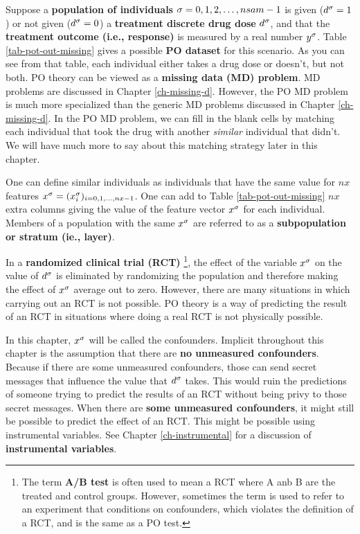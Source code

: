 Suppose a {\bf population
of individuals} $\sigma=0,1,2, \ldots, nsam-1$
is given ($d^\sigma=1$) or
not given ($d^\sigma=0$)
a {\bf treatment discrete drug dose} $d^\sigma$,
and that
the 
 {\bf treatment outcome (i.e., response)}
is measured by
a real number $y^\sigma$.
Table \ref{tab-pot-out-missing}
gives a possible {\bf PO dataset}
for this scenario.
As you
can see from
that table,
each individual 
either takes a drug
dose or
doesn't,
but not both.
PO theory
can be viewed as a
 {\bf  missing
data (MD) problem}. MD problems are 
discussed in
 Chapter \ref{ch-missing-d}.
However, the PO MD problem 
is much more specialized
than the generic MD problems
discussed in Chapter \ref{ch-missing-d}.
In the PO MD
problem, we can
fill
in the blank cells
by matching
each individual
that took
the drug with
another {\it similar} 
individual that didn't.
We will have much
more to say about
this matching
strategy later in this chapter.

One can define
similar
individuals as 
individuals that have the same
value
for $nx$ features $x^\sigma=(x^\sigma_i)_{i=0, 1, \ldots, nx-1}$.
One
can add to Table \ref{tab-pot-out-missing}
 $nx$ extra columns
giving the value of
the feature vector $x^\sigma$
for each individual.
Members
of a population with
the same $x^\sigma$ 
are referred to as 
a
{\bf subpopulation or stratum (ie., layer)}.

In a {\bf randomized clinical trial (RCT)}
\footnote{The term {\bf A/B test}
is often used to mean a RCT
where A anb B are the treated and control groups. However,
sometimes the term is used to refer to 
an experiment  that conditions on confounders,
which violates the definition of a RCT,
and is the same as a PO test.},
the effect 
of the variable $x^\sigma$ on 
the value
of $d^\sigma$
is eliminated by
randomizing
the population
and therefore
making the effect of $x^\sigma$
average out  to zero.
However,
there are many situations
in which carrying out an RCT is not
possible. PO theory is
a way of predicting the
result
of an RCT in situations where
doing a real RCT is not physically possible.

In this chapter, $x^\sigma$
will be called the confounders.
Implicit throughout this chapter
is the assumption that there are {\bf 
no unmeasured confounders}.
Because if 
there are some unmeasured confounders,
those can
send secret messages 
that influence the value 
that $d^\sigma$ takes.
This would ruin
the
predictions
of someone trying
to predict the results of an RCT
without
being privy to those secret 
messages.
When there are {\bf some
unmeasured confounders},
it might still be
possible
to
predict the effect of an RCT.
This might be possible
using instrumental variables. See Chapter
\ref{ch-instrumental}
for a discussion
of {\bf instrumental
variables}.



